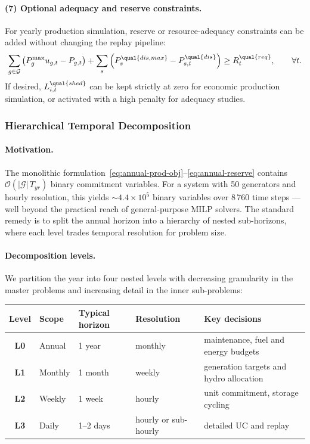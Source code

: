 \paragraph{(7) Optional adequacy and reserve constraints.}
For yearly production simulation, reserve or resource-adequacy constraints can
be added without changing the replay pipeline:
\begin{align}
\sum_{g\in\mathcal{G}} \left(P_g^{\max}u_{g,t} - P_{g,t}\right)
+ \sum_s \left(P_s^{\qual{dis,max}} - P_{s,t}^{\qual{dis}}\right)
\ge R_t^{\qual{req}},
\qquad \forall t.
\label{eq:annual-reserve}
\end{align}
If desired, \(L_{i,t}^{\qual{shed}}\) can be kept strictly at zero for economic
production simulation, or activated with a high penalty for adequacy studies.

\subsubsection{Hierarchical Temporal Decomposition}
\label{sec:annual-decomposition}

\paragraph{Motivation.}
The monolithic formulation~\eqref{eq:annual-prod-obj}--\eqref{eq:annual-reserve}
contains \(\mathcal{O}(|\mathcal{G}|\,T_{yr})\) binary commitment variables.
For a system with 50 generators and hourly resolution, this yields
\(\sim 4.4\times10^5\) binary variables over 8\,760 time steps --- well beyond
the practical reach of general-purpose MILP solvers.  The standard remedy is to
split the annual horizon into a hierarchy of nested sub-horizons, where each
level trades temporal resolution for problem size.

\paragraph{Decomposition levels.}
We partition the year into four nested levels with decreasing granularity
in the master problems and increasing detail in the inner sub-problems:

\begin{center}
\small
\begin{tabular}{cllll}
\toprule
Level & Scope & Typical horizon & Resolution & Key decisions \\
\midrule
\textbf{L0} & Annual & 1 year & monthly & maintenance, fuel and energy budgets \\
\textbf{L1} & Monthly & 1 month & weekly & generation targets and hydro allocation \\
\textbf{L2} & Weekly & 1 week & hourly & unit commitment, storage cycling \\
\textbf{L3} & Daily & 1--2 days & hourly or sub-hourly & detailed UC and replay \\
\bottomrule
\end{tabular}
\end{center}

